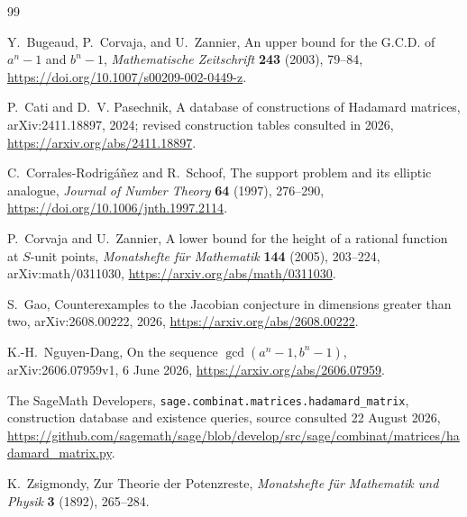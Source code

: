 \documentclass[11pt,oneside]{article}
\theoremstyle{definition}
\theoremstyle{remark}
\begin{document}
\begin{thebibliography}{99}

Y.~Bugeaud, P.~Corvaja, and U.~Zannier,
\newblock An upper bound for the G.C.D. of $a^n-1$ and $b^n-1$,
\newblock \emph{Mathematische Zeitschrift} \textbf{243} (2003), 79--84,
\newblock \url{https://doi.org/10.1007/s00209-002-0449-z}.

P.~Cati and D.~V. Pasechnik,
\newblock A database of constructions of Hadamard matrices,
\newblock arXiv:2411.18897, 2024; revised construction tables consulted in 2026,
\newblock \url{https://arxiv.org/abs/2411.18897}.

C.~Corrales-Rodrig\'a\~nez and R.~Schoof,
\newblock The support problem and its elliptic analogue,
\newblock \emph{Journal of Number Theory} \textbf{64} (1997), 276--290,
\newblock \url{https://doi.org/10.1006/jnth.1997.2114}.

P.~Corvaja and U.~Zannier,
\newblock A lower bound for the height of a rational function at $S$-unit points,
\newblock \emph{Monatshefte f\"ur Mathematik} \textbf{144} (2005), 203--224,
\newblock arXiv:math/0311030,
\newblock \url{https://arxiv.org/abs/math/0311030}.

S.~Gao,
\newblock Counterexamples to the Jacobian conjecture in dimensions greater than two,
\newblock arXiv:2608.00222, 2026,
\newblock \url{https://arxiv.org/abs/2608.00222}.

K.-H.~Nguyen-Dang,
\newblock On the sequence $\gcd(a^n-1,b^n-1)$,
\newblock arXiv:2606.07959v1, 6 June 2026,
\newblock \url{https://arxiv.org/abs/2606.07959}.

The SageMath Developers,
\newblock \texttt{sage.combinat.matrices.hadamard\_matrix}, construction database and
existence queries,
\newblock source consulted 22 August 2026,
\newblock \url{https://github.com/sagemath/sage/blob/develop/src/sage/combinat/matrices/hadamard_matrix.py}.

K.~Zsigmondy,
\newblock Zur Theorie der Potenzreste,
\newblock \emph{Monatshefte f\"ur Mathematik und Physik} \textbf{3} (1892), 265--284.

\end{thebibliography}
\end{document}
